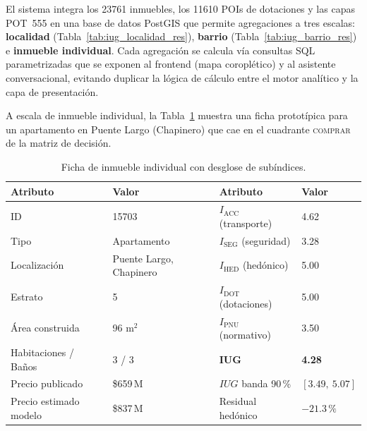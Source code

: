 \documentclass[12pt, a4paper, twoside, openright]{report}
\theoremstyle{plain}
\theoremstyle{definition}
\newcommand{\IHED}{I_{\text{HED}}} %
\newcommand{\IACC}{I_{\text{ACC}}} %
\newcommand{\ISEG}{I_{\text{SEG}}} %
\newcommand{\IDOT}{I_{\text{DOT}}} %
\newcommand{\IPNU}{I_{\text{PNU}}} %
\newcommand{\IUG}{IUG}             %
\begin{document}
El sistema integra los \num{23761} inmuebles, los \num{11610} POIs de dotaciones y las capas POT~555 en una base de datos PostGIS que permite agregaciones a tres escalas: \textbf{localidad} (Tabla~\ref{tab:iug_localidad_res}), \textbf{barrio} (Tabla~\ref{tab:iug_barrio_res}) e \textbf{inmueble individual}. Cada agregación se calcula vía consultas SQL parametrizadas que se exponen al frontend (mapa coroplético) y al asistente conversacional, evitando duplicar la lógica de cálculo entre el motor analítico y la capa de presentación.

A escala de inmueble individual, la Tabla~\ref{tab:detalle_inmueble} muestra una ficha prototípica para un apartamento en Puente Largo (Chapinero) que cae en el cuadrante \textsc{comprar} de la matriz de decisión.

\begin{table}[htbp]
\centering
\caption{Ficha de inmueble individual con desglose de subíndices.}
\label{tab:detalle_inmueble}
\small
\begin{tabular}{@{}llll@{}}
\toprule
\textbf{Atributo} & \textbf{Valor} & \textbf{Atributo} & \textbf{Valor} \\
\midrule
ID                 & \num{15703}           & $\IACC$ (transporte)     & 4.62 \\
Tipo               & Apartamento           & $\ISEG$ (seguridad)      & 3.28 \\
Localización       & Puente Largo, Chapinero & $\IHED$ (hedónico)     & 5.00 \\
Estrato            & 5                     & $\IDOT$ (dotaciones)     & 5.00 \\
Área construida    & 96 m$^2$              & $\IPNU$ (normativo)      & 3.50 \\
Habitaciones / Baños & 3 / 3               & $\boldsymbol{\IUG}$      & \textbf{4.28} \\
Precio publicado   & \$659\,M              & $\IUG$ banda 90\,\%      & $[3.49,\ 5.07]$ \\
Precio estimado modelo & \$837\,M          & Residual hedónico        & $-21.3\,\%$ \\
\bottomrule
\end{tabular}
\end{table}
\end{document}
